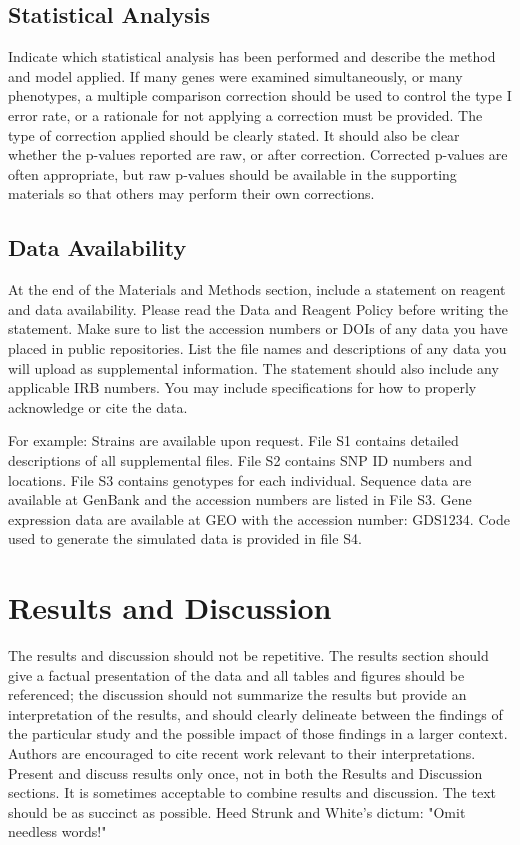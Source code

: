 \documentclass[9pt,twocolumn,twoside]{gsag3jnl}
\begin{document}
\subsection{Statistical Analysis} 

Indicate which statistical analysis has been performed and describe the method and model applied. If many genes were examined simultaneously, or many phenotypes, a multiple comparison correction should be used to control the type I error rate, or a rationale for not applying a correction must be provided. The type of correction applied should be clearly stated. It should also be clear whether the p-values reported are raw, or after correction. Corrected p-values are often appropriate, but raw p-values should be available in the supporting materials so that others may perform their own corrections. 

\subsection{Data Availability}

At the end of the Materials and Methods section, include a statement on reagent and data availability. Please read the Data and Reagent Policy before writing the statement. Make sure to list the accession numbers or DOIs of any data you have placed in public repositories. List the file names and descriptions of any data you will upload as supplemental information. The statement should also include any applicable IRB numbers. You may include specifications for how to properly acknowledge or cite the data.

For example: Strains are available upon request. File S1 contains detailed descriptions of all supplemental files. File S2 contains SNP ID numbers and locations. File S3 contains genotypes for each individual. Sequence data are available at GenBank and the accession numbers are listed in File S3. Gene expression data are available at GEO with the accession number: GDS1234. Code used to generate the simulated data is provided in file S4. 

\section{Results and Discussion}

The results and discussion should not be repetitive. The results section should give a factual presentation of the data and all tables and figures should be referenced; the discussion should not summarize the results but provide an interpretation of the results, and should clearly delineate between the findings of the particular study and the possible impact of those findings in a larger context. Authors are encouraged to cite recent work relevant to their interpretations. Present and discuss results only once, not in both the Results and Discussion sections. It is sometimes acceptable to combine results and discussion. The text should be as succinct as possible. Heed Strunk and White's dictum: "Omit needless words!"
\end{document}
